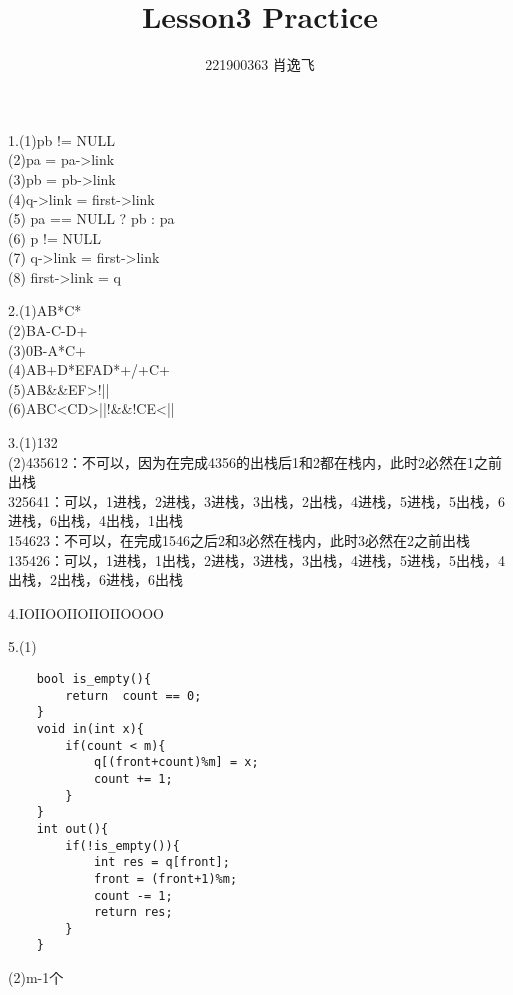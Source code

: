 \documentclass[12pt,a4paper,oneside]{ctexart}
\title{Lesson3 Practice}
\author{221900363 肖逸飞}
\begin{document}

\maketitle

1.(1)pb != NULL
\\ (2)pa = pa->link
\\ (3)pb = pb->link
\\ (4)q->link = first->link
\\ (5) pa == NULL ? pb : pa
\\ (6) p != NULL
\\ (7) q->link = first->link
\\ (8) first->link = q

2.(1)AB*C*
\\ (2)BA-C-D+
\\ (3)0B-A*C+
\\ (4)AB+D*EFAD*+/+C+
\\ (5)AB\&\&EF>!||
\\ (6)ABC<CD>||!\&\&!CE<||

3.(1)132
\\ (2)435612：不可以，因为在完成4356的出栈后1和2都在栈内，此时2必然在1之前出栈
\\ 325641：可以，1进栈，2进栈，3进栈，3出栈，2出栈，4进栈，5进栈，5出栈，6进栈，6出栈，4出栈，1出栈
\\ 154623：不可以，在完成1546之后2和3必然在栈内，此时3必然在2之前出栈
\\ 135426：可以，1进栈，1出栈，2进栈，3进栈，3出栈，4进栈，5进栈，5出栈，4出栈，2出栈，6进栈，6出栈

4.IOIIOOIIOIIOIIOOOO

5.(1)

\begin{lstlisting}
    bool is_empty(){
        return  count == 0;
    }
    void in(int x){
        if(count < m){
            q[(front+count)%m] = x;
            count += 1;
        }
    }
    int out(){
        if(!is_empty()){
            int res = q[front];
            front = (front+1)%m;
            count -= 1;
            return res;
        }
    }
\end{lstlisting}

(2)m-1个
\end{document}
